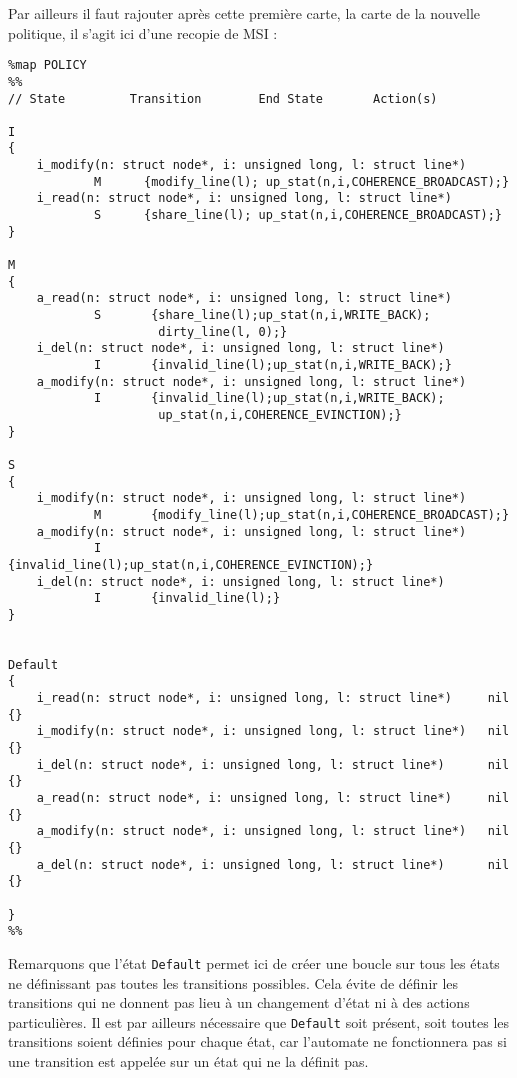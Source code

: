 Par ailleurs il faut rajouter après cette première carte, la carte de la nouvelle politique, il s'agit ici d'une recopie de MSI :
\begin{framed}
\begin{verbatim}
%map POLICY
%%
// State         Transition        End State       Action(s)

I
{
	i_modify(n: struct node*, i: unsigned long, l: struct line*)       
            M      {modify_line(l); up_stat(n,i,COHERENCE_BROADCAST);}
	i_read(n: struct node*, i: unsigned long, l: struct line*)         
            S      {share_line(l); up_stat(n,i,COHERENCE_BROADCAST);}           
}

M
{
	a_read(n: struct node*, i: unsigned long, l: struct line*)        
            S       {share_line(l);up_stat(n,i,WRITE_BACK);
                     dirty_line(l, 0);}
	i_del(n: struct node*, i: unsigned long, l: struct line*)         
            I       {invalid_line(l);up_stat(n,i,WRITE_BACK);}     
	a_modify(n: struct node*, i: unsigned long, l: struct line*)      
            I       {invalid_line(l);up_stat(n,i,WRITE_BACK);
                     up_stat(n,i,COHERENCE_EVINCTION);}
}

S
{
	i_modify(n: struct node*, i: unsigned long, l: struct line*)      
            M       {modify_line(l);up_stat(n,i,COHERENCE_BROADCAST);}
	a_modify(n: struct node*, i: unsigned long, l: struct line*)      
            I       {invalid_line(l);up_stat(n,i,COHERENCE_EVINCTION);}
	i_del(n: struct node*, i: unsigned long, l: struct line*)         
            I       {invalid_line(l);}                 
}


Default
{
	i_read(n: struct node*, i: unsigned long, l: struct line*)     nil    {}
	i_modify(n: struct node*, i: unsigned long, l: struct line*)   nil    {}
	i_del(n: struct node*, i: unsigned long, l: struct line*)      nil     {}
	a_read(n: struct node*, i: unsigned long, l: struct line*)     nil    {}
	a_modify(n: struct node*, i: unsigned long, l: struct line*)   nil    {}
	a_del(n: struct node*, i: unsigned long, l: struct line*)      nil     {}

}
%%
\end{verbatim}
\end{framed}

Remarquons que l'état \verb!Default! permet ici de créer une boucle sur tous les états ne définissant pas toutes les transitions possibles. Cela évite de définir les transitions qui ne donnent pas lieu à un changement d'état ni à des actions particulières. Il est par ailleurs nécessaire que \verb!Default! soit présent, soit toutes les transitions soient définies pour chaque état, car l'automate ne fonctionnera pas si une transition est appelée sur un état qui ne la définit pas.


